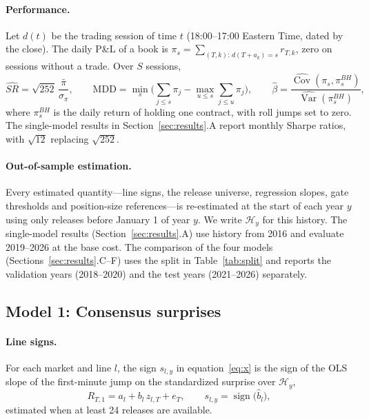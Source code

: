\paragraph{Performance.}
Let $d(t)$ be the trading session of time $t$ (18:00--17:00 Eastern Time, dated by the close). The
daily P\&L of a book is $\pi_s=\sum_{(T,k):\,d(T+a_k)=s} r_{T,k}$, zero on sessions without a trade.
Over $S$ sessions,
\begin{equation}\label{eq:sharpe}
  \widehat{SR} = \sqrt{252}\,\frac{\bar\pi}{\hat\sigma_\pi},\qquad
  \mathrm{MDD} = \min_{s}\Big(\sum_{j\le s}\pi_j-\max_{u\le s}\sum_{j\le u}\pi_j\Big),\qquad
  \hat\beta = \frac{\widehat{\operatorname{Cov}}(\pi_s,\pi^{BH}_s)}{\widehat{\operatorname{Var}}(\pi^{BH}_s)},
\end{equation}
where $\pi^{BH}_s$ is the daily return of holding one contract, with roll jumps set to zero. The
single-model results in Section~\ref{sec:results}.A report monthly Sharpe ratios, with
$\sqrt{12}$ replacing $\sqrt{252}$.

\paragraph{Out-of-sample estimation.}
Every estimated quantity---line signs, the release universe, regression slopes, gate thresholds
and position-size references---is re-estimated at the start of each year $y$ using only releases
before January 1 of year $y$. We write $\mathcal{H}_y$ for this history. The single-model results
(Section~\ref{sec:results}.A) use history from 2016 and evaluate 2019--2026 at the base cost. The
comparison of the four models (Sections~\ref{sec:results}.C--F) uses the split in
Table~\ref{tab:split} and reports the validation years (2018--2020) and the test years (2021--2026)
separately.

\subsection{Model 1: Consensus surprises}\label{sec:model_surprise}

\paragraph{Line signs.} For each market and line $l$, the sign $s_{l,y}$ in
equation~\eqref{eq:x} is the sign of the OLS slope of the first-minute jump on the standardized
surprise over $\mathcal{H}_y$,
\begin{equation}\label{eq:sign}
  R_{T,1} = a_l + b_l\, z_{l,T} + e_{T},\qquad s_{l,y}=\operatorname{sign}\big(\hat b_{l}\big),
\end{equation}
estimated when at least 24 releases are available.


